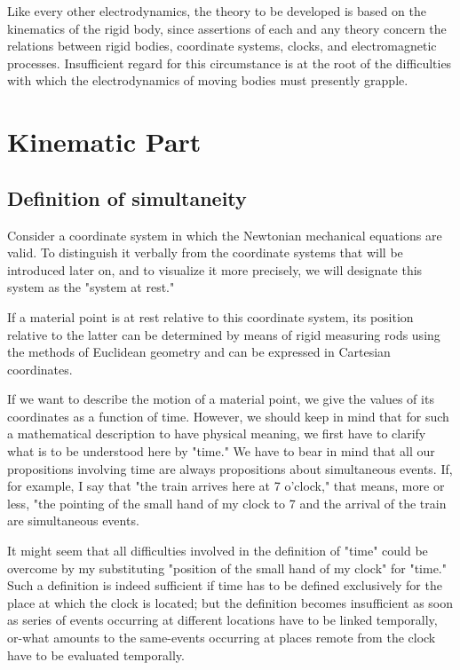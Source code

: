 ﻿\documentclass{article} %
\begin{document}
Like every other electrodynamics, the theory to be developed is based on the kinematics of the rigid body, since assertions of each and any theory concern the relations between rigid bodies, coordinate systems, clocks, and electromagnetic processes. 
Insufficient regard for this circumstance is at the root of the difficulties with which the electrodynamics of moving bodies must presently grapple.

\section{
Kinematic Part
}

\subsection{
Definition of simultaneity
}

Consider a coordinate system in which the Newtonian mechanical equations are valid. 
To distinguish it verbally from the coordinate systems that will be introduced later on, and to visualize it more precisely, we will designate this system as the "system at rest." 

If a material point is at rest relative to this coordinate system, its position relative to the latter can be determined by means of rigid measuring rods using the methods of Euclidean geometry and can be expressed in Cartesian coordinates. 

If we want to describe the motion of a material point, we give the values of its coordinates as a function of time. 
However, we should keep in mind that for such a mathematical description to have physical meaning, we first have to clarify what is to be understood here by "time." 
We have to bear in mind that all our propositions involving time are always propositions about simultaneous events. 
If, for example, I say that "the train arrives here at 7 o'clock," that means, more or less, "the pointing of the small hand of my clock to 7 and the arrival of the train are simultaneous events. 

It might seem that all difficulties involved in the definition of "time" could be overcome by my substituting "position of the small hand of my clock" for "time." 
Such a definition is indeed sufficient if time has to be defined exclusively for the place at which the clock is located; but the definition becomes insufficient as soon as series of events occurring at different locations have to be linked temporally, or-what amounts to the same-events occurring at places remote from the clock have to be evaluated temporally. 
\end{document}

